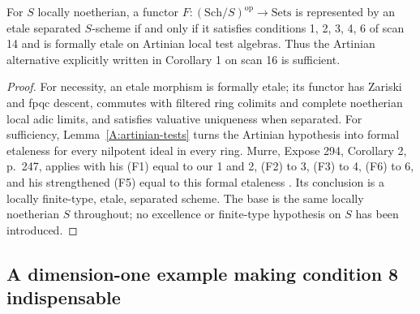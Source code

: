\begin{theorem}\label{A:etale-corollary}
For $S$ locally noetherian, a functor $F:(\mathrm{Sch}/S)^{\mathrm{op}}
\to\mathrm{Sets}$ is represented by an etale separated $S$-scheme if
and only if it satisfies conditions 1, 2, 3, 4, 6 of scan 14 and is
formally etale on Artinian local test algebras. Thus the Artinian
alternative explicitly written in Corollary 1 on scan 16 is sufficient.
\end{theorem}
\begin{proof}
For necessity, an etale morphism is formally etale; its functor has
Zariski and fpqc descent, commutes with filtered ring colimits and
complete noetherian local adic limits, and satisfies valuative
uniqueness when separated. For sufficiency,
Lemma~\ref{A:artinian-tests} turns the Artinian hypothesis into formal
etaleness for every nilpotent ideal in every ring. Murre, Expose 294,
Corollary 2, p.~247, applies with his (F1) equal to our 1 and 2,
(F2) to 3, (F3) to 4, (F6) to 6, and his strengthened (F5) equal
to this formal etaleness \cite{Murre1965}. Its conclusion is a
locally finite-type, etale, separated scheme. The base is the same
locally noetherian $S$ throughout; no excellence or finite-type
hypothesis on $S$ has been introduced.
\end{proof}

\subsection{A dimension-one example making condition 8 indispensable}

